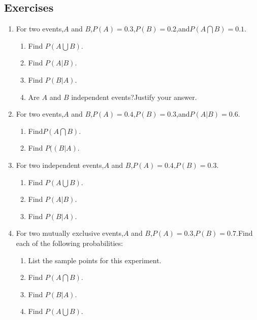 

\subsection{Exercises}
\begin{enumerate}
\item For two events,$A$ and $B$,$P(A)=0.3$,$P(B)=0.2$,and$P(A\bigcap B)=0.1$.

\begin{enumerate}
\item Find $P(A\bigcup B)$.
\item Find $P(A|B)$.
\item Find $P(B|A)$.
\item Are $A$ and $B$ independent events?Justify your answer. 
\end{enumerate}
\item For two events,$A$ and $B$,$P(A)=0.4$,$P(B)=0.3$,and$P(A|B)=0.6$.

\begin{enumerate}
\item Find$P(A\bigcap B)$.
\item Find $P((B|A)$.
\end{enumerate}

\item For two independent events,$A$ and $B$,$P(A)=0.4$,$P(B)=0.3$.
\begin{enumerate}
\item Find $P(A\bigcup B)$.
\item Find $P(A|B)$.
\item Find $P(B|A)$.
\end{enumerate}



\item For two mutually exclusive events,$A$ and $B$,$P(A)=0.3$,$P(B)=0.7$.Find each of the following probabilities:
\begin{enumerate}
\item List the sample points for this experiment.
\item Find $P(A\bigcap B)$.
\item Find $P(B|A)$.
\item Find $P(A\bigcup B)$.
\end{enumerate}

\end{enumerate}



\iffalse
\begin{frame} \frametitle{Exercises}%

\noindent Exercises:

\bigskip

\noindent 11th edition, p. 151:  3.47-3.51

\bigskip

\noindent 10th edition, p. 166:  3.41-3.45

\end{frame}
\fi 
